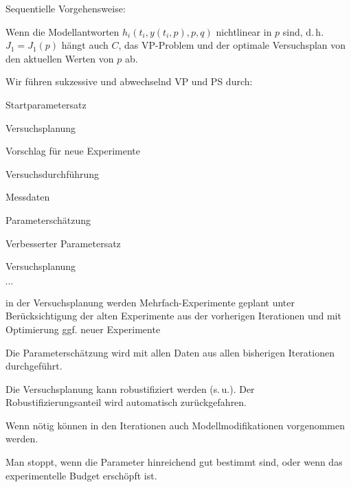 Sequentielle Vorgehensweise:

Wenn die Modellantworten $h_i(t_i,y(t_i,p),p,q)$ nichtlinear in $p$ sind, d.\,h. $J_1 = J_1(p)$ hängt auch $C$, das VP-Problem und der optimale Versuchsplan von den aktuellen Werten von $p$ ab.

Wir führen sukzessive und abwechselnd VP und PS durch:

\bitm
\item Startparametersatz
\item Versuchsplanung
\item Vorschlag für neue Experimente
\item Versuchsdurchführung
\item Messdaten
\item Parameterschätzung
\item Verbesserter Parametersatz
\item Versuchsplanung
\item $\cdots$
\eitm


\bitm
\item in der Versuchsplanung werden Mehrfach-Experimente geplant unter Berücksichtigung der alten Experimente aus der vorherigen Iterationen und mit Optimierung ggf. neuer Experimente
\item Die Parameterschätzung wird mit allen Daten aus allen bisherigen Iterationen durchgeführt.
\item Die Versuchsplanung kann robustifiziert werden (s.\,u.). Der Robustifizierungsanteil wird automatisch zurückgefahren. 
\item Wenn nötig können in den Iterationen auch Modellmodifikationen vorgenommen werden.
\item Man stoppt, wenn die Parameter hinreichend gut bestimmt sind, oder wenn das experimentelle Budget erschöpft ist.
\eitm













